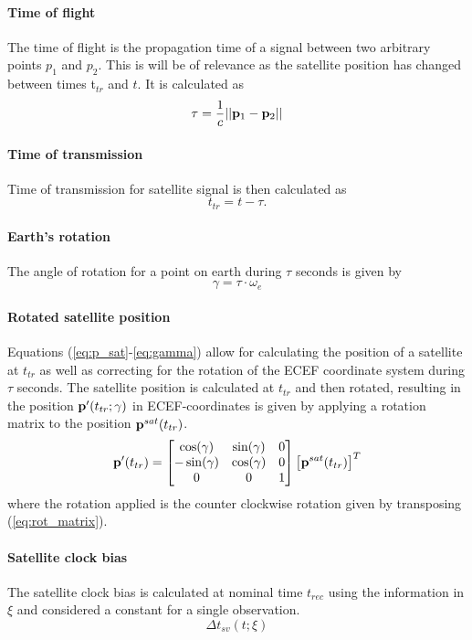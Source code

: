 \paragraph{Time of flight}
The time of flight is the propagation time of a signal between two arbitrary points $p_1$ and $p_2$. This is will be of relevance as the satellite position has changed between times t$_{tr}$ and $t$. It is calculated as
\begin{equation}\label{eq:tof}
\tau=\frac{1}{c}||{\bf p}_1-{\bf p}_2||
\end{equation}
\paragraph{Time of transmission}
Time of transmission for satellite signal is then calculated as 
\begin{equation}
t_{tr}=t-\tau.
\end{equation}
\paragraph{Earth's rotation}
The angle of rotation for a point on earth during $\tau$ seconds is given by 
\begin{equation}\label{eq:gamma}
\gamma=\tau\cdot\omega_e
\end{equation} 
\paragraph{Rotated satellite position}
Equations (\ref{eq:p_sat}-\ref{eq:gamma}) allow for calculating the position of a satellite at $t_{tr}$ as well as correcting for the rotation of the ECEF coordinate system during $\tau$ seconds. The satellite position is calculated at $t_{tr}$ and then rotated, resulting in the position ${\bf p}'(t_{tr};\gamma)$ in ECEF-coordinates is given by applying a rotation matrix to the position ${\bf p}^{sat}(t_{tr})$.
\begin{equation}\label{eq:coord_rotation}
{\bf p}'(t_{tr})=\begin{bmatrix} \cos(\gamma) &\sin(\gamma) &0\\  -\sin(\gamma) &\cos(\gamma)& 0\\ 0& 0 &1
\end{bmatrix}\left[{\bf p}^{sat}(t_{tr})\right]^T
\end{equation}
where the rotation applied is the counter clockwise rotation given by transposing (\ref{eq:rot_matrix}).
\paragraph{Satellite clock bias}
The satellite clock bias is calculated at nominal time $t_{rec}$ using the information in $\xi$ and considered a constant for a single observation.
\begin{equation} \label{estDtSV}
\Delta t_{sv}(t;\xi)
\end{equation}

